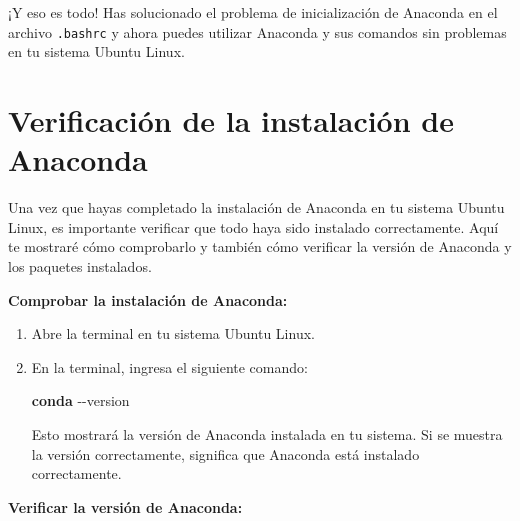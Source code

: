 \documentclass[
  letterpaper,
  DIV=11,
  numbers=noendperiod]{scrartcl}
\newenvironment{Shaded}{}{}
\newcommand{\AttributeTok}[1]{\textcolor[rgb]{0.84,0.23,0.29}{#1}}
\newcommand{\ExtensionTok}[1]{\textcolor[rgb]{0.84,0.23,0.29}{\textbf{#1}}}
\begin{document}
¡Y eso es todo! Has solucionado el problema de inicialización de
Anaconda en el archivo \texttt{.bashrc} y ahora puedes utilizar Anaconda
y sus comandos sin problemas en tu sistema Ubuntu Linux.

\hypertarget{verificaciuxf3n-de-la-instalaciuxf3n-de-anaconda}{%
\section{Verificación de la instalación de
Anaconda}\label{verificaciuxf3n-de-la-instalaciuxf3n-de-anaconda}}

Una vez que hayas completado la instalación de Anaconda en tu sistema
Ubuntu Linux, es importante verificar que todo haya sido instalado
correctamente. Aquí te mostraré cómo comprobarlo y también cómo
verificar la versión de Anaconda y los paquetes instalados.

\textbf{Comprobar la instalación de Anaconda:}

\begin{enumerate}
\def\labelenumi{\arabic{enumi}.}
\item
  Abre la terminal en tu sistema Ubuntu Linux.
\item
  En la terminal, ingresa el siguiente comando:

\begin{Shaded}
\begin{Highlighting}[]
\ExtensionTok{conda} \AttributeTok{{-}{-}version}
\end{Highlighting}
\end{Shaded}

  Esto mostrará la versión de Anaconda instalada en tu sistema. Si se
  muestra la versión correctamente, significa que Anaconda está
  instalado correctamente.
\end{enumerate}

\textbf{Verificar la versión de Anaconda:}
\end{document}
